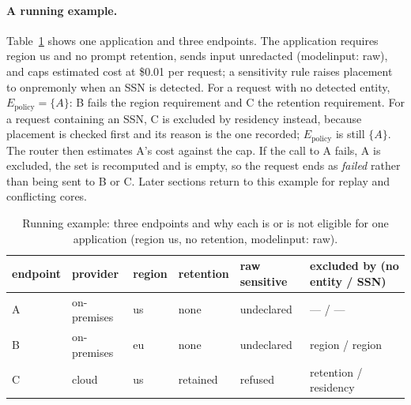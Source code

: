 \documentclass[11pt]{article}
\newcommand{\ubreak}{\textunderscore\allowbreak}
\newcommand{\code}[1]{{\ttfamily\let\_\ubreak #1}}
\begin{document}
\paragraph{A running example.} Table~\ref{tab:example} shows one application and three
endpoints. The application requires region \code{us} and no prompt retention, sends input
unredacted (\code{model\_input: raw}), and caps estimated cost at \$0.01 per request; a
sensitivity rule raises placement to \code{onprem\_only} when an SSN is detected. For a request
with no detected entity, $E_{\mathrm{policy}} = \{A\}$: B fails the region requirement and C the
retention requirement. For a request containing an SSN, C is excluded by residency instead,
because placement is checked first and its reason is the one recorded; $E_{\mathrm{policy}}$ is
still $\{A\}$. The router then estimates A's cost against the cap. If the call to A fails, A is
excluded, the set is recomputed and is empty, so the request ends as \emph{failed} rather than
being sent to B or C. Later sections return to this example for replay and conflicting cores.

\begin{table}[t]
\centering
\small
\caption{Running example: three endpoints and why each is or is not eligible for one
application (region \code{us}, no retention, \code{model\_input: raw}).}
\label{tab:example}
\begin{tabular}{@{}lllllp{4.4cm}@{}}
\toprule
endpoint & provider & region & retention & raw sensitive & excluded by (no entity / SSN) \\
\midrule
A & on-premises & us & none & undeclared & --- / --- \\
B & on-premises & eu & none & undeclared & region / region \\
C & cloud & us & retained & refused & retention / residency \\
\bottomrule
\end{tabular}
\end{table}
\end{document}

